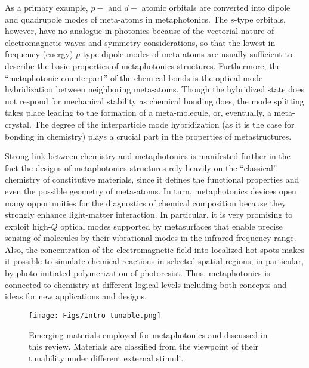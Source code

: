 \documentclass[journal=chreay,manuscript=review]{achemso}
\begin{document}
As a primary example, $p-$ and $d-$ atomic orbitals are converted into dipole and quadrupole modes of meta-atoms in metaphotonics. The $s$-type orbitals, however, have no analogue in photonics because of the vectorial nature of electromagnetic waves and symmetry considerations, so that the lowest in frequency (energy) $p$-type dipole modes of meta-atoms are usually sufficient to describe the basic properties of metaphotonics structures. Furthermore, the ``metaphotonic counterpart'' of the chemical bonds is the  optical mode hybridization between neighboring meta-atoms. Though the hybridized state does not respond for mechanical stability as chemical bonding does, the mode splitting takes place leading to the formation of a meta-molecule, or, eventually, a meta-crystal. The degree of the interparticle mode hybridization (as it is the case for bonding in chemistry) plays a crucial part in the properties of metastructures. 

Strong link between chemistry and metaphotonics is manifested further in the fact the designs of metaphotonics structures rely heavily on the ``classical'' chemistry of constitutive materials, since it defines the functional properties and even the possible geometry of meta-atoms. In turn, metaphotonics devices open many opportunities for the diagnostics of chemical composition because they strongly enhance light-matter interaction. In particular, it is very promising to exploit high-$Q$ optical modes supported by metasurfaces that enable precise sensing of molecules by their vibrational modes in the infrared frequency range. Also, the concentration of the electromagnetic field into localized hot spots makes it possible to simulate chemical reactions in selected spatial regions, in particular, by photo-initiated polymerization of photoresist. Thus, metaphotonics is connected to chemistry at different logical levels including both concepts and ideas for new applications and designs.


\begin{figure}[b!]
    \centering
    \texttt{[image: Figs/Intro-tunable.png]}
    \caption{Emerging materials employed for metaphotonics and discussed in this review. Materials are classified from the viewpoint of their tunability under different external stimuli. }
    \label{fig:tune}
\end{figure}
\end{document}
